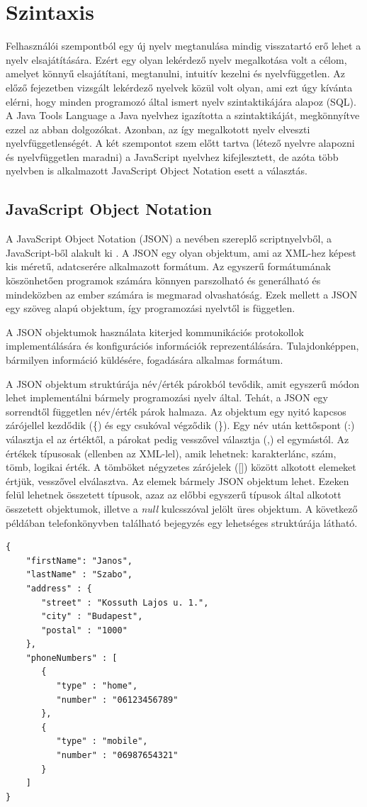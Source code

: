 \documentclass[a4paper,12pt]{report}
\begin{document}
\section{Szintaxis}
Felhasználói szempontból egy új nyelv megtanulása mindig visszatartó erő lehet a nyelv elsajátítására. Ezért egy olyan lekérdező nyelv megalkotása volt a célom, amelyet könnyű elsajátítani, megtanulni, intuitív kezelni és nyelvfüggetlen. Az előző fejezetben vizsgált lekérdező nyelvek közül volt olyan, ami ezt úgy kívánta elérni, hogy minden programozó által ismert nyelv szintaktikájára alapoz (SQL). A Java Tools Language a Java nyelvhez igazította a szintaktikáját, megkönnyítve ezzel az abban dolgozókat. Azonban, az így megalkotott nyelv elveszti nyelvfüggetlenségét. A két szempontot szem előtt tartva (létező nyelvre alapozni és nyelvfüggetlen maradni) a JavaScript nyelvhez kifejlesztett, de azóta több nyelvben is alkalmazott JavaScript Object Notation esett a választás.
\subsection{JavaScript Object Notation}
A JavaScript Object Notation (JSON) a nevében szereplő scriptnyelvből, a JavaScript-ből alakult ki \cite{json}. A JSON egy olyan objektum, ami az XML-hez képest kis méretű, adatcserére alkalmazott formátum. Az egyszerű formátumának köszönhetően programok számára könnyen parszolható és generálható és mindeközben az ember számára is megmarad olvashatóság. Ezek mellett a JSON egy szöveg alapú objektum, így programozási nyelvtől is független.
\par A JSON objektumok használata kiterjed kommunikációs protokollok implementálására és konfigurációs információk reprezentálására. Tulajdonképpen, bármilyen információ küldésére, fogadására alkalmas formátum.
\par A JSON objektum struktúrája név/érték párokból tevődik, amit egyszerű módon lehet implementálni bármely programozási nyelv által. Tehát, a JSON egy sorrendtől független név/érték párok halmaza. Az objektum egy nyitó kapcsos zárójellel kezdődik (\{) és egy csukóval végződik (\}). Egy név után kettőspont (:) választja el az értéktől, a párokat pedig vesszővel választja (,) el egymástól. Az értékek típusosak (ellenben az XML-lel), amik lehetnek: karakterlánc, szám, tömb, logikai érték. A tömböket négyzetes zárójelek ([]) között alkotott elemeket értjük, vesszővel elválasztva. Az elemek bármely JSON objektum lehet. Ezeken felül lehetnek összetett típusok, azaz az előbbi egyszerű típusok által alkotott összetett objektumok, illetve a \textit{null} kulcsszóval jelölt üres objektum. A következő példában telefonkönyvben található bejegyzés egy lehetséges struktúrája látható.
\begin{verbatim}
{
    "firstName": "Janos",
    "lastName" : "Szabo",
    "address" : {
       "street" : "Kossuth Lajos u. 1.",
       "city" : "Budapest",
       "postal" : "1000"
    },
    "phoneNumbers" : [
       {
          "type" : "home",
          "number" : "06123456789"
       },
       {
          "type" : "mobile",
          "number" : "06987654321"
       }
    ]
}
\end{verbatim}
\end{document}
